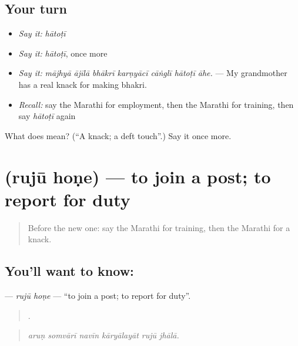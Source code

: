 \subsection*{Your turn}
\begin{itemize}
\raggedright
  \item \emph{Say it:} \emph{hātoṭī}
  \item \emph{Say it:} \emph{hātoṭī}, once more
  \item \emph{Say it:} \emph{mājhyā ājīlā bhākrī karṇyācī cāṅglī hātoṭī āhe.} — My grandmother has a real knack for making bhakri.
  \item \emph{Recall:} say the Marathi for employment, then the Marathi for training, then say \emph{hātoṭī} again
\end{itemize}

\begin{tcolorbox}[breakable,colback=teal!4,colframe=teal!35!black,title={Before you move on}]
What does  mean? (\textquotedblleft{}A knack; a deft touch\textquotedblright{}.) Say it once more.
\end{tcolorbox}
\section[\texorpdfstring{\mr{रुजू} \mr{होणे} (rujū hoṇe)}{रुजू होणे (rujū hoṇe)}]{  (rujū hoṇe) — to join a post; to report for duty}

\label{lesson:MR-C507-ruju-hone}



\begin{quote}
Before the new one: say the Marathi for training, then the Marathi for a knack.
\end{quote}

\subsection*{You'll want to know:  }
\textbf{ } — \emph{rujū hoṇe} — \textquotedblleft{}to join a post; to report for duty\textquotedblright{}.

\begin{quote}
     .
\end{quote}

\begin{quote}
\emph{aruṇ somvārī navīn kāryālayāt rujū jhālā.}
\end{quote}

